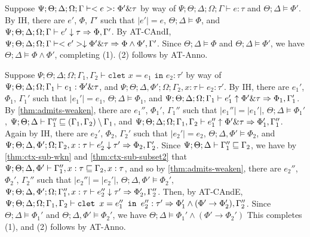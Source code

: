   \item[(T-CAndI)] Suppose
  $\Psi ; \Theta ; \Delta ; \Omega ; \Gamma \vdash <e> : \Phi' \& \tau$ by way of
  $\Psi ; \Theta ; \Delta ; \Omega ; \Gamma \vdash e : \tau$ and
  $\Theta ; \Delta \vDash \Phi'$.
  By IH, there are $e'$, $\Phi$, $\Gamma'$ such that
  $|e'| = e$,
  $\Theta ; \Delta \vDash \Phi$, and
  $\Psi  ; \Theta ; \Delta ; \Omega ; \Gamma \vdash e' \downarrow \tau \Rightarrow \Phi,\Gamma'$.
  By AT-CAndI,
  $\Psi; \Theta ; \Delta ; \Omega ; \Gamma \vdash <e'> \downarrow \Phi' \& \tau \Rightarrow \Phi \wedge \Phi',\Gamma'$.
  Since $\Theta ; \Delta \vDash \Phi$ and $\Theta ; \Delta \vDash \Phi'$, we have $\Theta ; \Delta \vDash \Phi \wedge \Phi'$,
  completing (1). (2) follows by AT-Anno.
  
  \item[(T-CAndE)] Suppose
  $\Psi ; \Theta ; \Delta ; \Omega ; \Gamma_1,\Gamma_2 \vdash \texttt{clet } x = e_1 \texttt{ in } e_2 : \tau'$ by way of
  $\Psi ; \Theta ; \Delta ; \Omega ; \Gamma_1 \vdash e_1 : \Phi' \& \tau$, and
  $\Psi ; \Theta ; \Delta, \Phi' ; \Omega ; \Gamma_2, x : \tau \vdash e_2 : \tau'$.
  By IH, there are $e_1'$, $\Phi_1$, $\Gamma_1'$ such that
  $|e_1'| = e_1$,
  $\Theta ; \Delta \vDash \Phi_1$, and
  $\Psi ; \Theta ; \Delta ; \Omega ; \Gamma_1 \vdash e_1' \uparrow \Phi' \& \tau \Rightarrow \Phi_1,\Gamma_1'$.
  By \autoref{thm:admits-weaken}, there are $e_1''$, $\Phi_1'$, $\Gamma_1''$ such that
  $|e_1''| = |e_1'|$,
  $\Theta ; \Delta \vDash \Phi_1'$,
  $\Psi ; \Theta ; \Delta \vdash \Gamma_1'' \sqsubseteq (\Gamma_1,\Gamma_2) \setminus \Gamma_1$, and
  $\Psi ; \Theta ; \Delta ; \Omega ; \Gamma_1,\Gamma_2 \vdash e_1'' \uparrow \Phi' \& \tau \Rightarrow \Phi_1',\Gamma_1''$.
  Again by IH, there are $e_2'$, $\Phi_2$, $\Gamma_2'$ such that
  $|e_2'| = e_2$,
  $\Theta ; \Delta,\Phi' \vDash \Phi_2$, and
  $\Psi ; \Theta ; \Delta,\Phi' ; \Omega ; \Gamma_2,x : \tau \vdash e_2' \downarrow \tau' \Rightarrow \Phi_2,\Gamma_2'$.
  Since
  $\Psi ; \Theta ; \Delta \vdash \Gamma_1'' \sqsubseteq \Gamma_2$, we have by \autoref{thm:ctx-sub-wkn} and \autoref{thm:ctx-sub-subset2}
  that
  $\Psi ; \Theta ; \Delta,\Phi' \vdash \Gamma_1'',x : \tau \sqsubseteq \Gamma_2,x : \tau$,
  and so by \autoref{thm:admits-weaken}, there are $e_2''$, $\Phi_2'$, $\Gamma_2''$ such that
  $|e_2''| = |e_2'|$,
  $\Theta ; \Delta, \Phi' \vDash \Phi_2'$,
  $\Psi ; \Theta ; \Delta, \Phi' ; \Omega ;\Gamma_1'',x:\tau \vdash e_2'' \downarrow \tau' \Rightarrow \Phi_2',\Gamma_2''$.
  Then, by AT-CAndE,
  $\Psi ; \Theta ; \Delta ; \Omega ; \Gamma_1,\Gamma_2 \vdash \texttt{clet } x = e_1'' \texttt{ in } e_2'' : \tau' \Rightarrow \Phi_1' \wedge (\Phi' \to \Phi_2'),\Gamma_2''$.
  Since $\Theta ; \Delta \vDash \Phi_1'$ and $\Theta ; \Delta, \Phi' \vDash \Phi_2'$,
  we have $\Theta ; \Delta \vDash \Phi_1' \wedge (\Phi' \to \Phi_2')$
  This completes (1), and (2) follows by AT-Anno.
  
